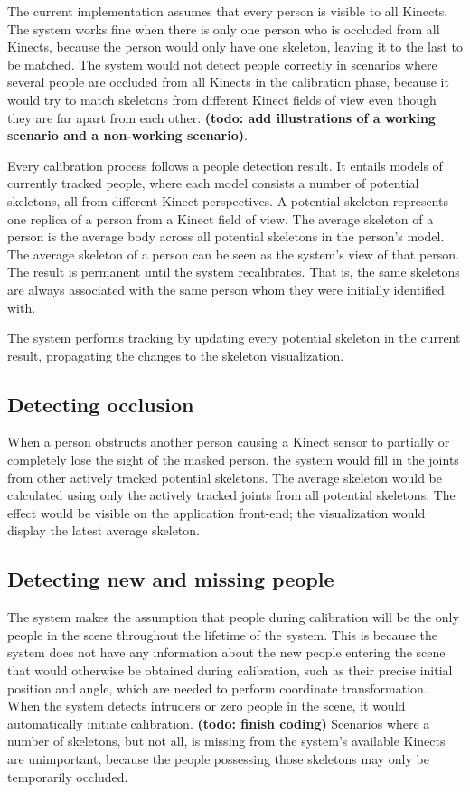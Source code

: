 \documentclass{sigchi}
\begin{document}
The current implementation assumes that every person is visible to all Kinects. The system works fine when there is only one person who is occluded from all Kinects, because the person would only have one skeleton, leaving it to the last to be matched. The system would not detect people correctly in scenarios where several people are occluded from all Kinects in the calibration phase, because it would try to match skeletons from different Kinect fields of view even though they are far apart from each other. \textbf{(todo: add illustrations of a working scenario and a non-working scenario)}.

Every calibration process follows a people detection result. It entails models of currently tracked people, where each model consists a number of potential skeletons, all from different Kinect perspectives. A potential skeleton represents one replica of a person from a Kinect field of view. The average skeleton of a person is the average body across all potential skeletons in the person's model. The average skeleton of a person can be seen as the system's view of that person. The result is permanent until the system recalibrates. That is, the same skeletons are always associated with the same person whom they were initially identified with. 

The system performs tracking by updating every potential skeleton in the current result, propagating the changes to the skeleton visualization.

\subsection{Detecting occlusion}

When a person obstructs another person causing a Kinect sensor to partially or completely lose the sight of the masked person, the system would fill in the joints from other actively tracked potential skeletons. The average skeleton would be calculated using only the actively tracked joints from all potential skeletons. The effect would be visible on the application front-end; the visualization would display the latest average skeleton.

\subsection{Detecting new and missing people}

The system makes the assumption that people during calibration will be the only people in the scene throughout the lifetime of the system. This is because the system does not have any information about the new people entering the scene that would otherwise be obtained during calibration, such as their precise initial position and angle, which are needed to perform coordinate transformation. When the system detects intruders or zero people in the scene, it would automatically initiate calibration. \textbf{(todo: finish coding)} Scenarios where a number of skeletons, but not all, is missing from the system's available Kinects are unimportant, because the people possessing those skeletons may only be temporarily occluded.
\end{document}

